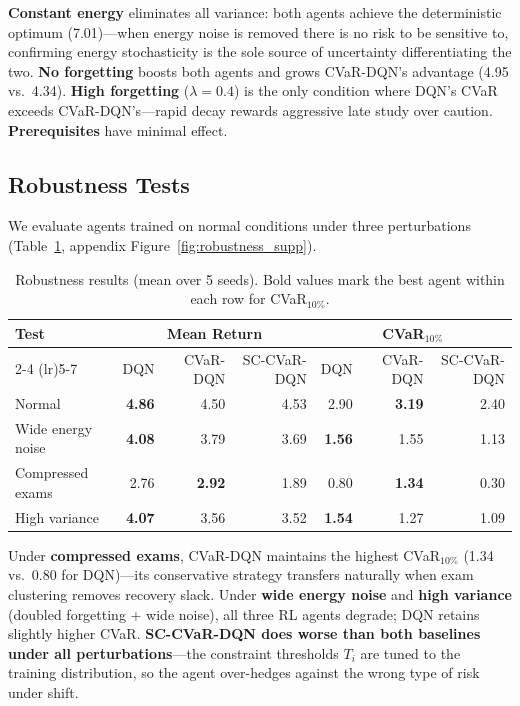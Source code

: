 \documentclass[a4paper,11pt]{article}
\theoremstyle{definition}
\begin{document}
\noindent\textbf{Constant energy} eliminates all variance: both agents achieve the deterministic optimum (7.01)---when energy noise is removed there is no risk to be sensitive to, confirming energy stochasticity is the sole source of uncertainty differentiating the two. \textbf{No forgetting} boosts both agents and grows CVaR-DQN's advantage (4.95 vs.\ 4.34). \textbf{High forgetting} ($\lambda=0.4$) is the only condition where DQN's CVaR exceeds CVaR-DQN's---rapid decay rewards aggressive late study over caution. \textbf{Prerequisites} have minimal effect.

\subsection{Robustness Tests}

We evaluate agents trained on normal conditions under three perturbations (Table~\ref{tab:robustness}, appendix Figure~\ref{fig:robustness_supp}).

\begin{table}[H]
\centering
\caption{Robustness results (mean over 5 seeds). Bold values mark the best agent within each row for CVaR$_{10\%}$.}
\label{tab:robustness}
\begin{tabular}{lrrrrrr}
\toprule
Test & \multicolumn{3}{c}{Mean Return} & \multicolumn{3}{c}{CVaR$_{10\%}$} \\
\cmidrule(lr){2-4} \cmidrule(lr){5-7}
     & DQN & CVaR-DQN & SC-CVaR-DQN & DQN & CVaR-DQN & SC-CVaR-DQN \\
\midrule
Normal            & \textbf{4.86} & 4.50 & 4.53 & 2.90 & \textbf{3.19} & 2.40 \\
Wide energy noise & \textbf{4.08} & 3.79 & 3.69 & \textbf{1.56} & 1.55 & 1.13 \\
Compressed exams  & 2.76 & \textbf{2.92} & 1.89 & 0.80 & \textbf{1.34} & 0.30 \\
High variance     & \textbf{4.07} & 3.56 & 3.52 & \textbf{1.54} & 1.27 & 1.09 \\
\bottomrule
\end{tabular}
\end{table}


Under \textbf{compressed exams}, CVaR-DQN maintains the highest CVaR$_{10\%}$ (1.34 vs.\ 0.80 for DQN)---its conservative strategy transfers naturally when exam clustering removes recovery slack. Under \textbf{wide energy noise} and \textbf{high variance} (doubled forgetting + wide noise), all three RL agents degrade; DQN retains slightly higher CVaR. \textbf{SC-CVaR-DQN does worse than both baselines under all perturbations}---the constraint thresholds $T_i$ are tuned to the training distribution, so the agent over-hedges against the wrong type of risk under shift.
\end{document}
